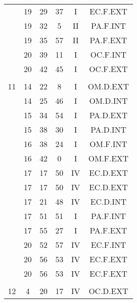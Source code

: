 \documentclass[12pt, a4paper]{article}
\begin{document}
\begin{multicols}{3}
{\begin{tabular}{c c c c c c}
	 	 	 	 & 19 & 29 & 37 & I & EC.F.EXT\\%
	 	 	 	 & 19 & 32 & 5 & II & PA.F.INT\\%
	 	 	 	 & 19 & 35 & 57 & II & PA.F.EXT\\%
	 	 	 	 & 20 & 39 & 11 & I & OC.F.INT\\%
	 	 	 	 & 20 & 42 & 45 & I & OC.F.EXT\\%
	 	 	 	 & & & & & \\%
	 	 	 	11 & 14 & 22 & 8 & I & OM.D.EXT\\%
	 	 	 	 & 14 & 25 & 46 & I & OM.D.INT\\%
	 	 	 	 & 15 & 34 & 54 & I & PA.D.EXT\\%
	 	 	 	 & 15 & 38 & 30 & I & PA.D.INT\\%
	 	 	 	 & 16 & 38 & 24 & I & OM.F.INT\\%
	 	 	 	 & 16 & 42 & 0 & I & OM.F.EXT\\%
	 	 	 	 & 17 & 17 & 50 & IV & EC.D.EXT\\%
	 	 	 	 & 17 & 17 & 50 & IV & EC.D.EXT\\%
	 	 	 	 & 17 & 21 & 48 & IV & EC.D.INT\\%
	 	 	 	 & 17 & 51 & 51 & I & PA.F.INT\\%
	 	 	 	 & 17 & 55 & 27 & I & PA.F.EXT\\%
	 	 	 	 & 20 & 52 & 57 & IV & EC.F.INT\\%
	 	 	 	 & 20 & 56 & 53 & IV & EC.F.EXT\\%
	 	 	 	 & 20 & 56 & 53 & IV & EC.F.EXT\\%
	 	 	 	 & & & & & \\%
	 	 	 	12 & 4 & 20 & 17 & IV & OC.D.EXT\\%
	 	 \end{tabular}
 	}
\end{multicols}
\end{document}
